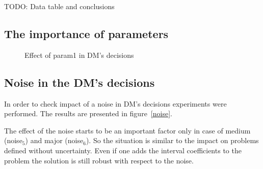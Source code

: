 TODO: Data table and conclusions
\clearpage{}

\subsection{The importance of parameters}


\begin{figure}
  \centering
  \caption{Effect of param1 in DM's decisions}
  \label{param1}
\end{figure}
\clearpage{}

\subsection{Noise in the DM's decisions}

In order to check impact of a noise in DM's decisions experiments were
performed. The results are presented in figure~\ref{noise}.

The effect of the noise starts to be an important factor only in case of
medium (noise$_5$) and major (noise$_6$). So the situation is similar to the
impact on problems defined without uncertainty. Even if one adds the interval
coefficients to the problem the solution is still robust with respect to the
noise.


